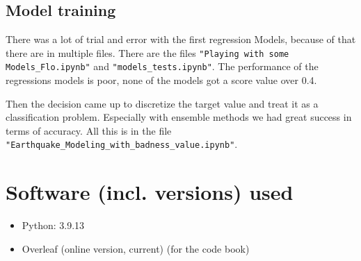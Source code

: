 \documentclass[a4paper]{article}
\begin{document}
\FloatBarrier

\subsection{Model training}

There was a lot of trial and error with the first regression Models, because of that there are in multiple files. There are the files \lstinline{"Playing with some Models_Flo.ipynb"} and \lstinline{"models_tests.ipynb"}. The performance of the regressions models is poor, none of the models got a score value over 0.4.

Then the decision came up to discretize the target value and treat it as a classification problem. Especially with ensemble methods we had great success in terms of accuracy. All this is in the file \lstinline{"Earthquake_Modeling_with_badness_value.ipynb"}.

\section{Software (incl. versions) used}

\begin{itemize}
    \item Python: 3.9.13
    \item Overleaf (online version, current) (for the code book)
\end{itemize}
\end{document}
